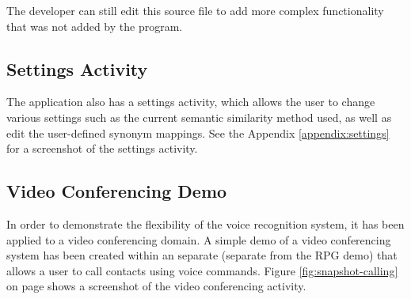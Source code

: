 \documentclass[11pt]{article}
\begin{document}
The developer can still edit this source file to add more complex functionality that was not added by the program.

\subsection{Settings Activity}

The application also has a settings activity, which allows the user to change various settings such as the current semantic similarity method used, as well as edit the user-defined synonym mappings. See the Appendix \ref{appendix:settings} for a screenshot of the settings activity.

\subsection{Video Conferencing Demo}

In order to demonstrate the flexibility of the voice recognition system, it has been applied to a video conferencing domain. A simple demo of a video conferencing system has been created within an separate (separate from the RPG demo) that allows a user to call contacts using voice commands. Figure \ref{fig:snapshot-calling} on page \pageref{fig:snapshot-calling} shows a screenshot of the video conferencing activity.
\end{document}
